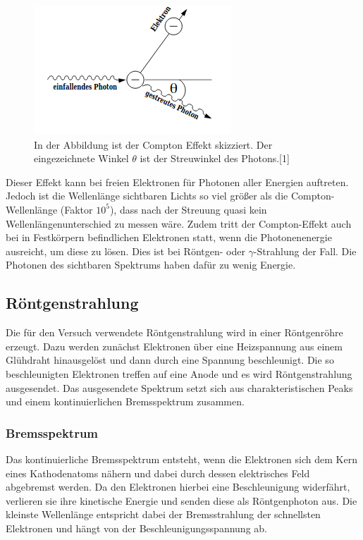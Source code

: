 \documentclass[titlepage = firstcover]{scrartcl}
\begin{document}
        \FloatBarrier
        \begin{figure}[h]
            \centering
            \includegraphics{SkizzeCompton.png}
            \caption{In der Abbildung ist der Compton Effekt skizziert. Der eingezeichnete Winkel $\theta$ ist der Streuwinkel des Photons.[1]}
            \label{fig:SkizzeCompton}
        \end{figure}
        \FloatBarrier
        \noindent

        Dieser Effekt kann bei freien Elektronen für Photonen aller Energien auftreten. Jedoch ist die Wellenlänge sichtbaren Lichts so viel größer
        als die Compton-Wellenlänge (Faktor $10^5$), dass nach der Streuung quasi kein Wellenlängenunterschied zu messen wäre. Zudem tritt der Compton-Effekt
        auch bei in Festkörpern befindlichen Elektronen statt, wenn die Photonenenergie ausreicht, um diese zu lösen. Dies ist bei Röntgen- oder $\gamma$-Strahlung
        der Fall. Die Photonen des sichtbaren Spektrums haben dafür zu wenig Energie.

        \subsection{Röntgenstrahlung}
        Die für den Versuch verwendete Röntgenstrahlung wird in einer Röntgenröhre erzeugt. Dazu werden zunächst Elektronen über eine Heizspannung aus einem
        Glühdraht hinausgelöst und dann durch eine Spannung beschleunigt. Die so beschleunigten Elektronen treffen auf eine Anode und es wird Röntgenstrahlung
        ausgesendet. Das ausgesendete Spektrum setzt sich aus charakteristischen Peaks und einem kontinuierlichen Bremsspektrum zusammen. 
        
            \subsubsection*{Bremsspektrum}
                Das kontinuierliche Bremsspektrum entsteht, wenn die Elektronen sich dem Kern eines Kathodenatoms nähern und dabei durch dessen elektrisches 
                Feld abgebremst werden. Da den Elektronen hierbei eine Beschleunigung widerfährt, verlieren sie ihre kinetische Energie und senden diese als 
                Röntgenphoton aus. Die kleinste Wellenlänge entspricht dabei der Bremsstrahlung der schnellsten Elektronen und hängt von der 
                Beschleunigungsspannung ab.
                
\end{document}
